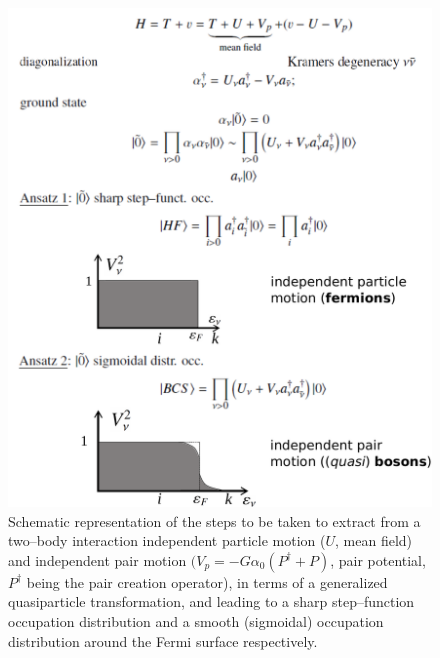 \begin{figure}\centerline{\includegraphics*[width=\textwidth,angle=0]{nutshell/figs/fig1D3.pdf}}
\caption{Schematic representation of the steps to be taken to extract from a two--body interaction independent particle motion ($U$, mean field) and independent pair motion $(V_p=-G\alpha_0(P^\dagger+P)$, pair potential, $P^\dagger$ being the pair creation operator), in terms of a generalized quasiparticle transformation, and leading to a sharp step--function occupation distribution and a smooth (sigmoidal) occupation distribution around the Fermi surface respectively.}\label{fig1D3}
\end{figure}




